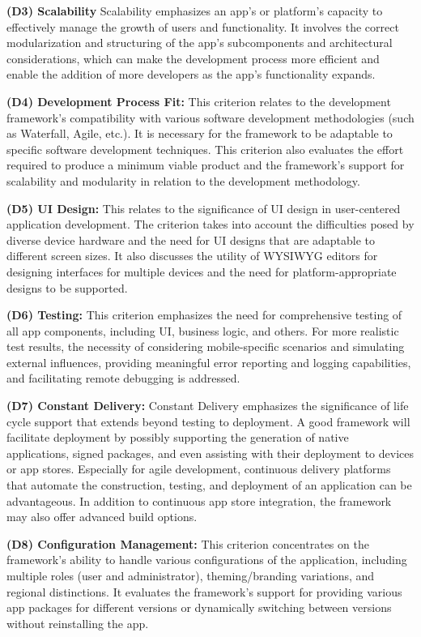 \textbf{(D3) Scalability}
Scalability emphasizes an app's or platform's capacity to effectively manage the growth of users and functionality. It involves the correct modularization and structuring of the app's subcomponents and architectural considerations, which can make the development process more efficient and enable the addition of more developers as the app's functionality expands.

\textbf{(D4) Development Process Fit:}
This criterion relates to the development framework's compatibility with various software development methodologies (such as Waterfall, Agile, etc.). It is necessary for the framework to be adaptable to specific software development techniques. This criterion also evaluates the effort required to produce a minimum viable product and the framework's support for scalability and modularity in relation to the development methodology.

\textbf{(D5) UI Design:}
This relates to the significance of UI design in user-centered application development. The criterion takes into account the difficulties posed by diverse device hardware and the need for UI designs that are adaptable to different screen sizes. It also discusses the utility of WYSIWYG editors for designing interfaces for multiple devices and the need for platform-appropriate designs to be supported.

\textbf{(D6) Testing:}
This criterion emphasizes the need for comprehensive testing of all app components, including UI, business logic, and others. For more realistic test results, the necessity of considering mobile-specific scenarios and simulating external influences, providing meaningful error reporting and logging capabilities, and facilitating remote debugging is addressed.

\textbf{(D7) Constant Delivery:}
Constant Delivery emphasizes the significance of life cycle support that extends beyond testing to deployment. A good framework will facilitate deployment by possibly supporting the generation of native applications, signed packages, and even assisting with their deployment to devices or app stores. Especially for agile development, continuous delivery platforms that automate the construction, testing, and deployment of an application can be advantageous. In addition to continuous app store integration, the framework may also offer advanced build options.

\textbf{(D8) Configuration Management:}
This criterion concentrates on the framework's ability to handle various configurations of the application, including multiple roles (user and administrator), theming/branding variations, and regional distinctions. It evaluates the framework's support for providing various app packages for different versions or dynamically switching between versions without reinstalling the app.

